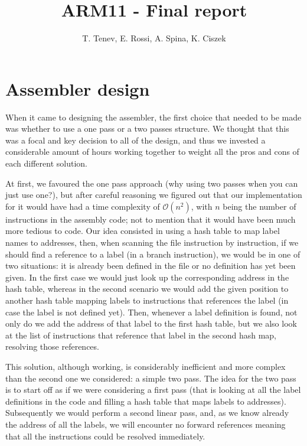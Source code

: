 \documentclass[11pt]{article}
\begin{document}
\title{ARM11 - Final report}
\author{T. Tenev, E. Rossi, A. Spina, K. Ciszek}

\maketitle

\section{Assembler design}
When it came to designing the assembler, the first choice that needed to be made was whether to use a one pass or a two passes structure. We thought that this was a focal and key decision to all of the design, and thus we invested a considerable amount of hours working together to weight all the pros and cons of each different solution.

At first, we favoured the one pass approach (why using two passes when you can just use one?), but after careful reasoning we figured out that our implementation for it would have had a time complexity of $\mathcal{O}(n^2)$, with $n$ being the number of instructions in the assembly code; not to mention that it would have been much more tedious to code. Our idea consisted in using a hash table to map label names to addresses, then, when scanning the file instruction by instruction, if we should find a reference to a label (in a branch instruction), we would be in one of two situations: it is already been defined in the file or no definition has yet been given. In the first case we would just look up the corresponding address in the hash table, whereas in the second scenario we would add the given position to another hash table mapping labels to instructions that references the label (in case the label is not defined yet). Then, whenever a label definition is found, not only do we add the address of that label to the first hash table, but we also look at the list of instructions that reference that label in the second hash map, resolving those references.

This solution, although working, is considerably inefficient and more complex than the second one we considered: a simple two pass. The idea for the two pass is to start off as if we were considering a first pass (that is looking at all the label definitions in the code and filling a hash table that maps labels to addresses). Subsequently we would perform a second linear pass, and, as we know already the address of all the labels, we will encounter no forward references meaning that all the instructions could be resolved immediately.
\end{document}
